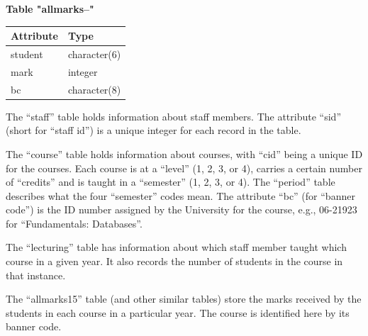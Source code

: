 \textbf{Table "allmarks--"}
\begin{tabular}{ll}
\textbf{Attribute} & \textbf{Type} \\
\hline
student & character(6) \\
mark & integer \\
bc & character(8) \\
\end{tabular}

The ``staff'' table holds information about staff members. The attribute ``sid'' (short for ``staff id'') is a unique integer for each record in the table.

The ``course'' table holds information about courses, with ``cid'' being a unique ID for the courses. Each course is at a ``level'' (1, 2, 3, or 4), carries a certain number of ``credits'' and is taught in a ``semester'' (1, 2, 3, or 4). The ``period'' table describes what the four ``semester'' codes mean. The attribute ``bc'' (for ``banner code'') is the ID number assigned by the University for the course, e.g., 06-21923 for ``Fundamentals: Databases''.

The ``lecturing'' table has information about which staff member taught which course in a given year. It also records the number of students in the course in that instance.

The ``allmarks15'' table (and other similar tables) store the marks received by the students in each course in a particular year. The course is identified here by its banner code.


